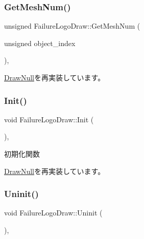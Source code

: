 \subsubsection{\texorpdfstring{Get\+Mesh\+Num()}{GetMeshNum()}}
{\footnotesize\ttfamily unsigned Failure\+Logo\+Draw\+::\+Get\+Mesh\+Num (\begin{DoxyParamCaption}\item[{unsigned}]{object\+\_\+index }\end{DoxyParamCaption})\hspace{0.3cm}{\ttfamily [override]}, {\ttfamily [virtual]}}



\mbox{\hyperlink{class_draw_null_ad735978a85a5f3583eecd82d6bfe6413}{Draw\+Null}}を再実装しています。

\mbox{\label{class_failure_logo_draw_a718d587edcabb1feea72153a79a65176}} 
\subsubsection{\texorpdfstring{Init()}{Init()}}
{\footnotesize\ttfamily void Failure\+Logo\+Draw\+::\+Init (\begin{DoxyParamCaption}{ }\end{DoxyParamCaption})\hspace{0.3cm}{\ttfamily [override]}, {\ttfamily [virtual]}}



初期化関数 



\mbox{\hyperlink{class_draw_null_acd7fef3ccea1da537ac9507ffbb6dd2e}{Draw\+Null}}を再実装しています。

\mbox{\label{class_failure_logo_draw_a97646253380b54f37565650e211f33cd}} 
\subsubsection{\texorpdfstring{Uninit()}{Uninit()}}
{\footnotesize\ttfamily void Failure\+Logo\+Draw\+::\+Uninit (\begin{DoxyParamCaption}{ }\end{DoxyParamCaption})\hspace{0.3cm}{\ttfamily [override]}, {\ttfamily [virtual]}}



